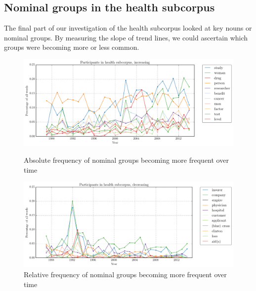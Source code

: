 \subsection{Nominal groups in the health subcorpus}

The final part of our investigation of the health subcorpus looked at key nouns or nominal groups. By measuring the slope of trend lines, we could ascertain which groups were becoming more or less common.

    \noindent
    \begin{figure}[htb!]
    \centering
    \begin{minipage}{.48\textwidth}
    \centering
    \includegraphics[width=.95\textwidth]{../images/1.png}
    \caption{Absolute frequency of nominal groups becoming more frequent over time}
    \label{fig:1}
    \end{minipage}%
    \begin{minipage}{.48\textwidth}
    \centering
    \includegraphics[width=.95\textwidth]{../images/2.png}
    \caption{Relative frequency of nominal groups becoming more frequent over time}
    \label{fig:2}
    \end{minipage}
    \end{figure}
    \noindent
